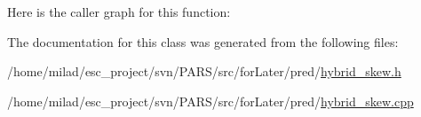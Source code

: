 Here is the caller graph for this function:




The documentation for this class was generated from the following files:\begin{DoxyCompactItemize}
\item 
/home/milad/esc\_\-project/svn/PARS/src/forLater/pred/\hyperlink{hybrid__skew_8h}{hybrid\_\-skew.h}\item 
/home/milad/esc\_\-project/svn/PARS/src/forLater/pred/\hyperlink{hybrid__skew_8cpp}{hybrid\_\-skew.cpp}\end{DoxyCompactItemize}
